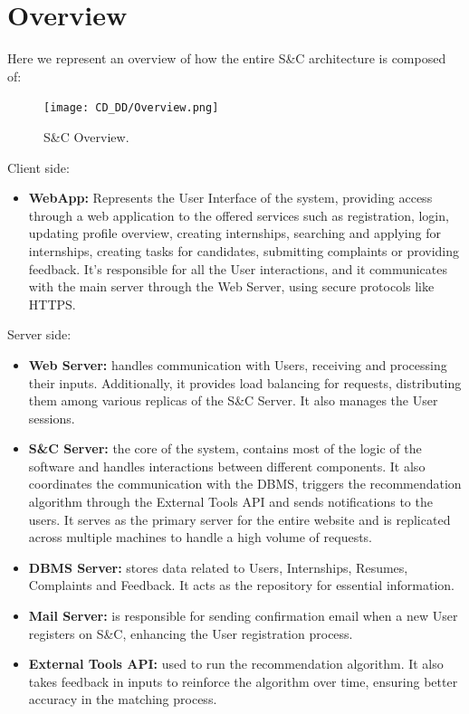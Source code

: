 \section{Overview}
\label{sec:overview}%
Here we represent an overview of how the entire S\&C architecture is composed of:

\begin{figure}[H]
    \begin{center}
        \texttt{[image: CD\_DD/Overview.png]}
        \caption{S\&C Overview.}
        \label{fig:CKB_overview}%
    \end{center}
\end{figure}

\noindent Client side:
\begin{itemize}
    \item \textbf{WebApp:} Represents the User Interface of the system, providing access through a web application to the offered services such as registration, login, updating profile overview, creating internships, searching and applying for internships, creating tasks for candidates, submitting complaints or providing feedback. It’s responsible for all the User interactions, and it communicates with the main server through the Web Server, using secure protocols like HTTPS.
\end{itemize}
\noindent Server side:
\begin{itemize}
    \item \textbf{Web Server:} handles communication with Users, receiving and processing their inputs. Additionally, it provides load balancing for requests, distributing them among various replicas of the S\&C Server. It also manages the User sessions.
    \item \textbf{S\&C Server:} the core of the system, contains most of the logic of the software and handles interactions between different components. It also coordinates the communication with the DBMS, triggers the recommendation algorithm through the External Tools API and sends notifications to the users. It serves as the primary server for the entire website and is replicated across multiple machines to handle a high volume of requests.
    \item \textbf{DBMS Server:} stores data related to Users, Internships, Resumes, Complaints and Feedback. It acts as the repository for essential information.
    \item \textbf{Mail Server:} is responsible for sending confirmation email when a new User registers on S\&C, enhancing the User registration process.
    \item \textbf{External Tools API:} used to run the recommendation algorithm. It also takes feedback in inputs to reinforce the algorithm over time, ensuring better accuracy in the matching process.
\end{itemize}

